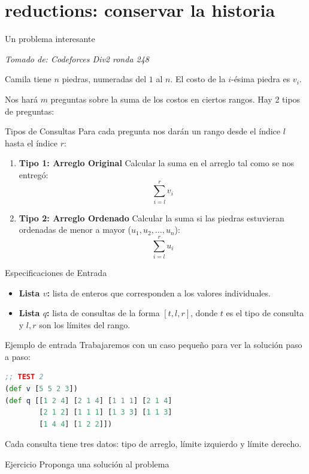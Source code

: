 \documentclass{beamer}
\begin{document}
\section{reductions: conservar la historia}

\begin{frame}{Un problema interesante}
    
    \textit{Tomado de: Codeforces Div2 ronda 248}

    Camila tiene $n$ piedras, numeradas del $1$ al $n$. 
    El costo de la $i$-ésima piedra es $v_i$.
    
    \vspace{0.3cm}
    Nos hará $m$ preguntas sobre la suma de los costos en ciertos rangos. Hay 2 tipos de preguntas:
    
\end{frame}


\begin{frame}{Tipos de Consultas}
    Para cada pregunta nos darán un rango desde el índice $l$ hasta el índice $r$:

    \begin{enumerate}
        \item \textbf{Tipo 1: Arreglo Original}
        Calcular la suma en el arreglo tal como se nos entregó:
        $$\sum_{i=l}^r v_i$$
        
        \item \textbf{Tipo 2: Arreglo Ordenado}
        Calcular la suma si las piedras estuvieran ordenadas de menor a mayor ($u_1, u_2, \dots, u_n$):
        $$\sum_{i=l}^r u_i$$
    \end{enumerate}
\end{frame}


\begin{frame}{Especificaciones de Entrada}
    \begin{itemize}
        \item \textbf{Lista $v$:} lista de enteros que corresponden a los valores individuales.
        \item \textbf{Lista $q$:} lista de consultas de la forma $[t, l, r]$, donde $t$ es el tipo de consulta y $l, r$ son los límites del rango.
    \end{itemize}
\end{frame}

\begin{frame}[fragile]{Ejemplo de entrada}
    Trabajaremos con un caso pequeño para ver la solución paso a paso:

    \begin{lstlisting}[language=Clojure]
;; TEST 2
(def v [5 5 2 3])
(def q [[1 2 4] [2 1 4] [1 1 1] [2 1 4]
        [2 1 2] [1 1 1] [1 3 3] [1 1 3]
        [1 4 4] [1 2 2]])
    \end{lstlisting}

    Cada consulta tiene tres datos: tipo de arreglo, límite izquierdo y límite derecho.

    \begin{block}{Ejercicio}
        Proponga una solución al problema
    \end{block}
\end{frame}
\end{document}

